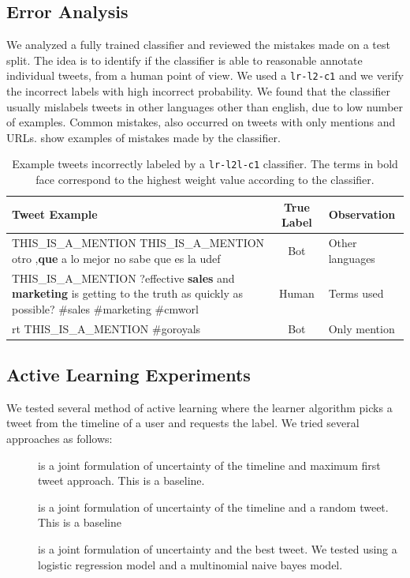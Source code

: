 \subsection{Error Analysis}
We analyzed a fully trained classifier and reviewed the mistakes made on a test split. The idea is to identify if the classifier is able to reasonable annotate individual tweets, from a human point of view. We used a {\tt{lr-l2-c1}} and we verify the incorrect labels with high incorrect probability. We found that the classifier usually mislabels tweets in other languages other than english, due to low number of examples. Common mistakes, also occurred on tweets with only mentions and URLs.  show examples of mistakes made by the classifier. 

\begin{table}[htdp]
\begin{center}
\begin{tabular}{|p{5cm}|c|l|}
\hline \textbf{Tweet Example} & \textbf{True Label} & \textbf{Observation} \\ \hline
THIS\_IS\_A\_MENTION THIS\_IS\_A\_MENTION  otro ,\textbf{que} a lo mejor no sabe que es la udef & Bot & Other languages \\ \hline
THIS\_IS\_A\_MENTION ?effective \textbf{sales} and \textbf{marketing} is getting to the truth as quickly as possible? \#sales \#marketing \#cmworl   & Human & Terms used \\ \hline
rt THIS\_IS\_A\_MENTION \#goroyals  & Bot & Only mention \\ \hline
\end{tabular}
\caption{Example tweets incorrectly labeled by a {\tt{lr-l2l-c1}} classifier. The terms in bold face correspond to the highest weight value according to the classifier.  }
\end{center}
\label{tab:twmistakes}
\end{table}%
 

\subsection{Active Learning Experiments}
We tested several method of active learning where the learner algorithm picks a tweet from the timeline of a user and requests the label. We tried several approaches as follows:
\begin{description}
\item[] is a joint formulation of uncertainty of the timeline and maximum first tweet approach. This is a baseline. 
\item[] is a joint formulation of uncertainty  of the timeline and a random tweet. This is a baseline
\item[] is a joint formulation of uncertainty and the best tweet. We tested using a logistic regression model and a multinomial naive bayes model. 
\end{description}

